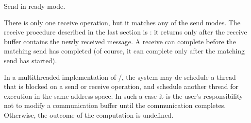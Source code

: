Send in ready mode.

There is only one receive operation,
but it matches
any of the send modes.
The receive procedure described in the last section is :
it returns only after the receive buffer contains the newly received
message.  A receive can complete before the matching send
has completed (of course, it can complete only after the matching send
has started).

In a multithreaded implementation of \MPI/, the system may de-schedule a
thread that is blocked on a send or receive
operation, and schedule another thread for execution in the same
address space.
In such a case it is the user's responsibility not to
modify a
communication
buffer until the communication completes.
Otherwise, the outcome of the computation is undefined.


